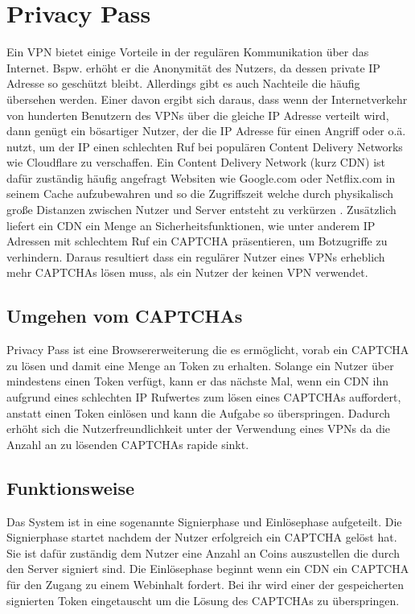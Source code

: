 \documentclass[11pt,a4paper]{scrreprt}
\begin{document}
\section{Privacy Pass}
\label{sec:privacy-pass}
Ein VPN bietet einige Vorteile in der regulären Kommunikation über das Internet. Bspw. erhöht er die Anonymität des Nutzers, da dessen private IP Adresse so geschützt bleibt. Allerdings gibt es auch Nachteile die häufig übersehen werden. Einer davon ergibt sich daraus, dass wenn der Internetverkehr von hunderten Benutzern des VPNs über die gleiche IP Adresse verteilt wird, dann genügt ein bösartiger Nutzer, der die IP Adresse für einen Angriff oder o.ä. nutzt, um der IP einen schlechten Ruf bei populären Content Delivery Networks wie Cloudflare zu verschaffen. Ein Content Delivery Network (kurz CDN) ist dafür zuständig häufig angefragt Websiten wie Google.com oder Netflix.com in seinem Cache aufzubewahren und so die Zugriffszeit welche durch physikalisch große Distanzen zwischen Nutzer und Server entsteht zu verkürzen \cite{pp-cdn}. Zusätzlich liefert ein CDN ein Menge an Sicherheitsfunktionen, wie unter anderem IP Adressen mit schlechtem Ruf ein CAPTCHA präsentieren, um Botzugriffe zu verhindern. Daraus resultiert dass ein regulärer Nutzer eines VPNs erheblich mehr CAPTCHAs lösen muss, als ein Nutzer der keinen VPN verwendet.

\subsection{Umgehen vom CAPTCHAs}
Privacy Pass ist eine Browsererweiterung die es ermöglicht, vorab ein CAPTCHA zu lösen und damit eine Menge an Token zu erhalten. Solange ein Nutzer über mindestens einen Token verfügt, kann er das nächste Mal, wenn ein CDN ihn aufgrund eines schlechten IP Rufwertes zum lösen eines CAPTCHAs auffordert, anstatt einen Token einlösen und kann die Aufgabe so überspringen. Dadurch erhöht sich die Nutzerfreundlichkeit unter der Verwendung eines VPNs da die Anzahl an zu lösenden CAPTCHAs rapide sinkt. \cite{pp-davidson2018privacy}

\subsection{Funktionsweise}
Das System ist in eine sogenannte Signierphase und Einlösephase aufgeteilt. Die Signierphase startet nachdem der Nutzer erfolgreich ein CAPTCHA gelöst hat. Sie ist dafür zuständig dem Nutzer eine Anzahl an Coins auszustellen die durch den Server signiert sind. Die Einlösephase beginnt wenn ein CDN ein CAPTCHA für den Zugang zu einem Webinhalt fordert. Bei ihr wird einer der gespeicherten signierten Token eingetauscht um die Lösung des CAPTCHAs zu überspringen. 
\end{document}
